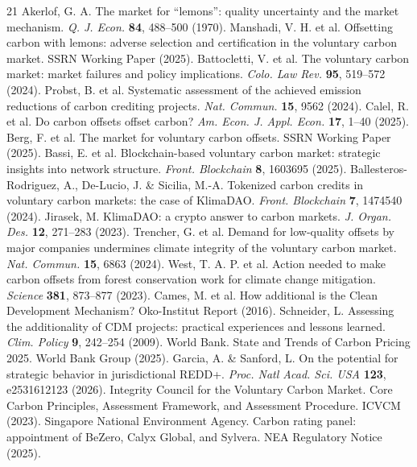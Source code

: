 \documentclass[sn-nature,Numbered]{sn-jnl}
\begin{document}
\begin{thebibliography}{21}
 Akerlof, G. A. The market for ``lemons'': quality uncertainty and the market mechanism. \textit{Q. J. Econ.} \textbf{84}, 488--500 (1970).
 Manshadi, V. H. et al. Offsetting carbon with lemons: adverse selection and certification in the voluntary carbon market. SSRN Working Paper (2025).
 Battocletti, V. et al. The voluntary carbon market: market failures and policy implications. \textit{Colo. Law Rev.} \textbf{95}, 519--572 (2024).
 Probst, B. et al. Systematic assessment of the achieved emission reductions of carbon crediting projects. \textit{Nat. Commun.} \textbf{15}, 9562 (2024).
 Calel, R. et al. Do carbon offsets offset carbon? \textit{Am. Econ. J. Appl. Econ.} \textbf{17}, 1--40 (2025).
 Berg, F. et al. The market for voluntary carbon offsets. SSRN Working Paper (2025).
 Bassi, E. et al. Blockchain-based voluntary carbon market: strategic insights into network structure. \textit{Front. Blockchain} \textbf{8}, 1603695 (2025).
 Ballesteros-Rodriguez, A., De-Lucio, J. \& Sicilia, M.-A. Tokenized carbon credits in voluntary carbon markets: the case of KlimaDAO. \textit{Front. Blockchain} \textbf{7}, 1474540 (2024).
 Jirasek, M. KlimaDAO: a crypto answer to carbon markets. \textit{J. Organ. Des.} \textbf{12}, 271--283 (2023).
 Trencher, G. et al. Demand for low-quality offsets by major companies undermines climate integrity of the voluntary carbon market. \textit{Nat. Commun.} \textbf{15}, 6863 (2024).
 West, T. A. P. et al. Action needed to make carbon offsets from forest conservation work for climate change mitigation. \textit{Science} \textbf{381}, 873--877 (2023).
 Cames, M. et al. How additional is the Clean Development Mechanism? Oko-Institut Report (2016).
 Schneider, L. Assessing the additionality of CDM projects: practical experiences and lessons learned. \textit{Clim. Policy} \textbf{9}, 242--254 (2009).
 World Bank. State and Trends of Carbon Pricing 2025. World Bank Group (2025).
 Garcia, A. \& Sanford, L. On the potential for strategic behavior in jurisdictional REDD+. \textit{Proc. Natl Acad. Sci. USA} \textbf{123}, e2531612123 (2026).
 Integrity Council for the Voluntary Carbon Market. Core Carbon Principles, Assessment Framework, and Assessment Procedure. ICVCM (2023).
 Singapore National Environment Agency. Carbon rating panel: appointment of BeZero, Calyx Global, and Sylvera. NEA Regulatory Notice (2025).

\end{thebibliography}
\end{document}
